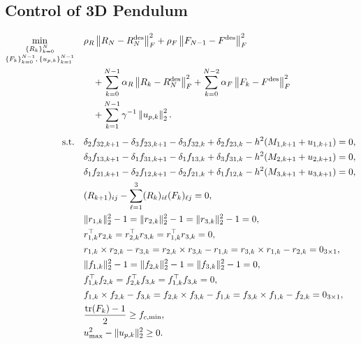 \subsection{Control of 3D Pendulum}
\label{sec:control_3d_pendulum}

\begin{subequations}\label{eq:forced_3d_pendulum_pop}
\begin{align}
\min_{\substack{\{R_k\}_{k=0}^{N}\\[0.1em]\{F_k\}_{k=0}^{N-1},\,\{u_{p,k}\}_{k=1}^{N-1}}}
\quad
&
\rho_R \left\| R_N - R_N^{\mathrm{des}} \right\|_F^2
+
\rho_F \left\| F_{N-1} - F^{\mathrm{des}} \right\|_F^2
\notag\\
&\quad
+
\sum_{k=0}^{N-1}
\alpha_R \left\| R_k - R_N^{\mathrm{des}} \right\|_F^2
+
\sum_{k=0}^{N-2}
\alpha_F \left\| F_k - F^{\mathrm{des}} \right\|_F^2
\notag\\
&\quad
+
\sum_{k=1}^{N-1}
\gamma^{-1}\left\|u_{p,k}\right\|_2^2 .
\label{eq:forced_3d_pendulum_pop_obj}
\\[0.4em]
\text{s.t.}\quad
&
\delta_2 f_{32,k+1}-\delta_3 f_{23,k+1}
-\delta_3 f_{32,k}+\delta_2 f_{23,k}
-h^2\!\left(M_{1,k+1}+u_{1,k+1}\right)=0,
\label{eq:forced_3d_pendulum_pop_dyn1}
\\
&
\delta_3 f_{13,k+1}-\delta_1 f_{31,k+1}
-\delta_1 f_{13,k}+\delta_3 f_{31,k}
-h^2\!\left(M_{2,k+1}+u_{2,k+1}\right)=0,
\label{eq:forced_3d_pendulum_pop_dyn2}
\\
&
\delta_1 f_{21,k+1}-\delta_2 f_{12,k+1}
-\delta_2 f_{21,k}+\delta_1 f_{12,k}
-h^2\!\left(M_{3,k+1}+u_{3,k+1}\right)=0,
\label{eq:forced_3d_pendulum_pop_dyn3}
\\
&
(R_{k+1})_{ij}-\sum_{\ell=1}^{3}(R_k)_{i\ell}(F_k)_{\ell j}=0,
\label{eq:forced_3d_pendulum_pop_kin}
\\
&
\|r_{1,k}\|_2^2-1=\|r_{2,k}\|_2^2-1=\|r_{3,k}\|_2^2-1=0,
\label{eq:forced_3d_pendulum_pop_R1}
\\
&
r_{1,k}^\top r_{2,k}=r_{2,k}^\top r_{3,k}=r_{1,k}^\top r_{3,k}=0,
\label{eq:forced_3d_pendulum_pop_R2}
\\
&
r_{1,k}\times r_{2,k}-r_{3,k}
=
r_{2,k}\times r_{3,k}-r_{1,k}
=
r_{3,k}\times r_{1,k}-r_{2,k}
=
0_{3\times1},
\label{eq:forced_3d_pendulum_pop_R3}
\\
&
\|f_{1,k}\|_2^2-1=\|f_{2,k}\|_2^2-1=\|f_{3,k}\|_2^2-1=0,
\label{eq:forced_3d_pendulum_pop_F1}
\\
&
f_{1,k}^\top f_{2,k}=f_{2,k}^\top f_{3,k}=f_{1,k}^\top f_{3,k}=0,
\label{eq:forced_3d_pendulum_pop_F2}
\\
&
f_{1,k}\times f_{2,k}-f_{3,k}
=
f_{2,k}\times f_{3,k}-f_{1,k}
=
f_{3,k}\times f_{1,k}-f_{2,k}
=
0_{3\times1},
\label{eq:forced_3d_pendulum_pop_F3}
\\
&
\frac{\operatorname{tr}(F_k)-1}{2}\ge f_{c,\min},
\label{eq:forced_3d_pendulum_pop_step}
\\
&
u_{\max}^2-\|u_{p,k}\|_2^2\ge 0.
\label{eq:forced_3d_pendulum_pop_u}
\end{align}
\end{subequations}

